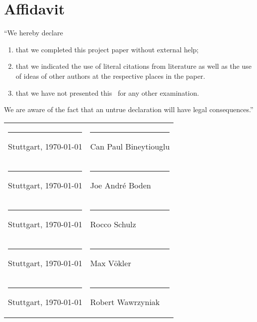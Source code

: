 \newpage
\pagestyle{empty}

\section*{Affidavit}

\vspace{0.5cm}

``We hereby declare\\

\begin{enumerate}
	\item that we completed this project paper without external help;
	\item that we indicated the use of literal citations from literature as well as the use of ideas of other authors at the respective places in the paper.
	\item that we have not presented this \papertype \ for any other examination.
\end{enumerate}

We are aware of the fact that an untrue declaration will have legal consequences.''
\\
\vspace{2.6cm}

\renewcommand{\arraystretch}{2} %

\begin{tabular*}{\textwidth} {p{} p{}}

\rule{0.3\textwidth}{1pt} \newline Stuttgart, \today & \rule{0.4\textwidth}{1pt}\newline Can Paul Bineytiouglu\\

\rule{0.3\textwidth}{1pt} \newline Stuttgart, \today & \rule{0.4\textwidth}{1pt}\newline Joe Andr\'{e} Boden\\

\rule{0.3\textwidth}{1pt} \newline Stuttgart, \today & \rule{0.4\textwidth}{1pt}\newline Rocco Schulz\\

\rule{0.3\textwidth}{1pt} \newline Stuttgart, \today & \rule{0.4\textwidth}{1pt}\newline Max V\"{o}kler\\

\rule{0.3\textwidth}{1pt} \newline Stuttgart, \today & \rule{0.4\textwidth}{1pt}\newline Robert Wawrzyniak\\
\end{tabular*}
